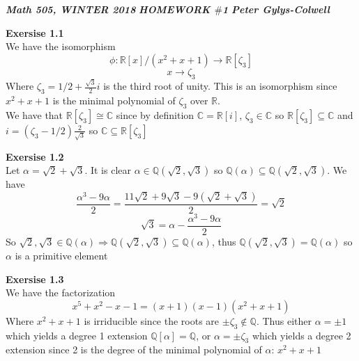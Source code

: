 \documentclass[12pt]{article}
\newenvironment{ques}[1]{\textbf{Exersise #1}\vspace{1 mm}\\ }{\bigskip}
\theoremstyle{definition}
\newcommand{\R}{\mathbb R}
\newcommand{\Q}{\mathbb Q}
\newcommand{\C}{\mathbb C}
\renewcommand{\a}{\alpha}
\begin{document}
\noindent \textit{\textbf{Math 505, WINTER 2018}} \hspace{1.3cm}
\textit{\textbf{HOMEWORK $\#$1}} \hspace{1.3cm} \textit{\textbf{Peter
Gylys-Colwell}} 

\vspace{1cm}

\begin{ques}{1.1}
	We have the  isomorphism
	$$\phi : \R[x]/(x^2 + x + 1) \to \R[\zeta_3]$$
	$$x \to \zeta_3$$
	Where $\zeta_3 = 1/2 + \frac{\sqrt 3 }{ 2}i$ is the third root of unity.
	This is an isomorphism since $x^2 + x + 1$ is the minimal polynomial of
	$\zeta_3$ over $\R$.\\
	We have that $\R[\zeta_3] \cong \C$ since by definition $\C = \R[i]$,
	$\zeta_3 \in \C$ so $\R[\zeta_3] \subseteq \C$ and $i = (\zeta_3 -
	1/2)\frac 2 {\sqrt 3}$ so $\C \subseteq \R[\zeta_3]$
\end{ques}

\begin{ques}{1.2}
	Let $\alpha = \sqrt 2 + \sqrt 3$. It is clear $\alpha \in \Q(\sqrt 2, \sqrt
	3)$ so $\Q(\alpha) \subseteq \Q(\sqrt 2, \sqrt 3)$. We have $$\frac{\a ^3 -
	9\a}{2} = \frac{11\sqrt 2 + 9\sqrt 3 - 9(\sqrt 2 + \sqrt 3)}{2} = \sqrt 2$$
	$$\sqrt 3 = \a - \frac{\a ^3 - 9\a}{2}$$ So $\sqrt 2, \sqrt 3 \in \Q(\a)
	\Rightarrow \Q(\sqrt 2, \sqrt 3) \subseteq \Q(\a)$, thus $\Q(\sqrt 2, \sqrt
	3) = \Q(\a)$ so $\a$ is a primitive element

\end{ques}

\begin{ques}{1.3}
	We have the factorization
	$$x^5 + x^2 - x - 1 = (x + 1)(x - 1)(x^2 + x + 1)$$
	Where $x^2 + x + 1$ is irriducible since the roots are $\pm \zeta_3 \notin
	\Q$. Thus either $\a = \pm 1$ which yields a degree 1 extension $\Q[\a] =
	\Q$, or $\a = \pm \zeta_3$ which yields a degree 2 extension since 2 is the
	degree of the minimal polynomial of $\a$: $x^2 + x + 1$
\end{ques}
\end{document}
